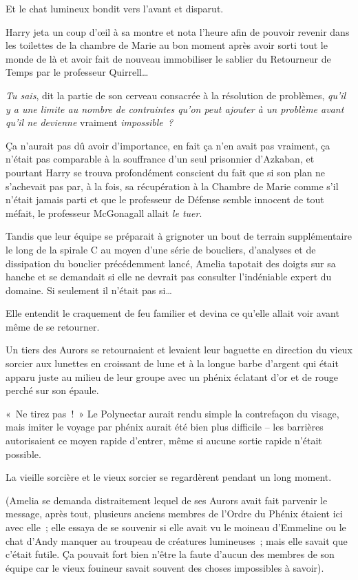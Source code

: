 Et le chat lumineux bondit vers l'avant et disparut.

Harry jeta un coup d'œil à sa montre et nota l'heure afin de pouvoir revenir dans les toilettes de la chambre de Marie au bon moment après avoir sorti tout le monde de là et avoir fait de nouveau immobiliser le sablier du Retourneur de Temps par le professeur Quirrell…

\emph{Tu sais}, dit la partie de son cerveau consacrée à la résolution de problèmes, \emph{qu'il y a une limite au nombre de contraintes qu'on peut ajouter à un problème avant qu'il ne devienne} vraiment \emph{impossible~?}

Ça n'aurait pas dû avoir d'importance, en fait ça n'en avait pas vraiment, ça n'était pas comparable à la souffrance d'un seul prisonnier d'Azkaban, et pourtant Harry se trouva profondément conscient du fait que si son plan ne s'achevait pas par, à la fois, sa récupération à la Chambre de Marie comme s'il n'était jamais parti et que le professeur de Défense semble innocent de tout méfait, le professeur McGonagall allait \emph{le tuer}.

\later

Tandis que leur équipe se préparait à grignoter un bout de terrain supplémentaire le long de la spirale C au moyen d'une série de boucliers, d'analyses et de dissipation du bouclier précédemment lancé, Amelia tapotait des doigts sur sa hanche et se demandait si elle ne devrait pas consulter l'indéniable expert du domaine. Si seulement il n'était pas si…

Elle entendit le craquement de feu familier et devina ce qu'elle allait voir avant même de se retourner.

Un tiers des Aurors se retournaient et levaient leur baguette en direction du vieux sorcier aux lunettes en croissant de lune et à la longue barbe d'argent qui était apparu juste au milieu de leur groupe avec un phénix éclatant d'or et de rouge perché sur son épaule.

«~Ne tirez pas~!~» Le Polynectar aurait rendu simple la contrefaçon du visage, mais imiter le voyage par phénix aurait été bien plus difficile -- les barrières autorisaient ce moyen rapide d'entrer, même si aucune sortie rapide n'était possible.

La vieille sorcière et le vieux sorcier se regardèrent pendant un long moment.

(Amelia se demanda distraitement lequel de ses Aurors avait fait parvenir le message, après tout, plusieurs anciens membres de l'Ordre du Phénix étaient ici avec elle~; elle essaya de se souvenir si elle avait vu le moineau d'Emmeline ou le chat d'Andy manquer au troupeau de créatures lumineuses~; mais elle savait que c'était futile. Ça pouvait fort bien n'être la faute d'aucun des membres de son équipe car le vieux fouineur savait souvent des choses impossibles à savoir).


